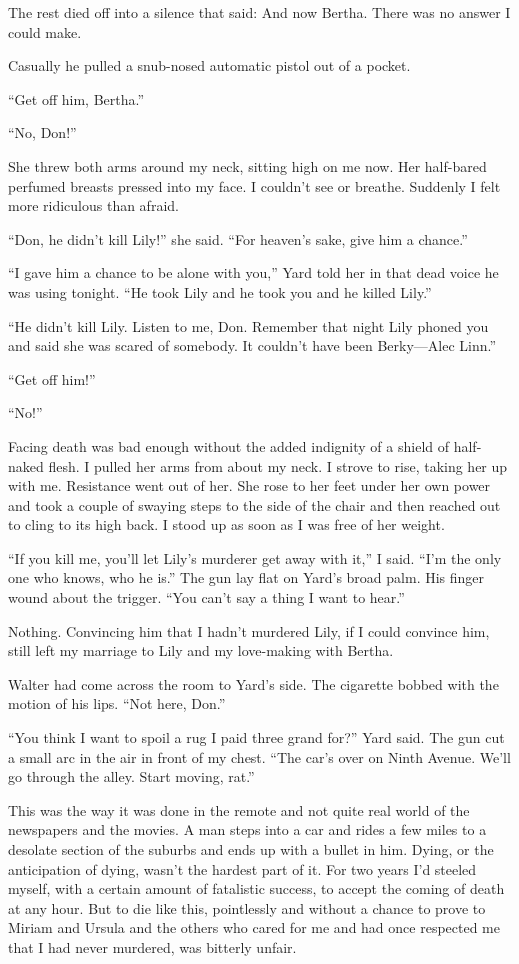 \documentclass{novel}
\begin{document}
The rest died off into a silence that said: And now Bertha. There was no answer I could make.

Casually he pulled a snub-nosed automatic pistol out of a pocket.

“Get off him, Bertha.”

“No, Don!”

She threw both arms around my neck, sitting high on me now. Her half-bared perfumed breasts pressed into my face. I couldn’t see or breathe. Suddenly I felt more ridiculous than afraid.

“Don, he didn’t kill Lily!” she said. “For heaven’s sake, give him a chance.”

“I gave him a chance to be alone with you,” Yard told her in that dead voice he was using tonight. “He took Lily and he took you and he killed Lily.”

“He didn’t kill Lily. Listen to me, Don. Remember that night Lily phoned you and said she was scared of somebody. It couldn’t have been Berky—Alec Linn.”

“Get off him!”

“No!”

Facing death was bad enough without the added indignity of a shield of half-naked flesh. I pulled her arms from about my neck. I strove to rise, taking her up with me. Resistance went out of her. She rose to her feet under her own power and took a couple of swaying steps to the side of the chair and then reached out to cling to its high back. I stood up as soon as I was free of her weight.

“If you kill me, you’ll let Lily’s murderer get away with it,” I said. “I’m the only one who knows, who he is.” The gun lay flat on Yard’s broad palm. His finger wound about the trigger. “You can’t say a thing I want to hear.”

Nothing. Convincing him that I hadn’t murdered Lily, if I could convince him, still left my marriage to Lily and my love-making with Bertha.

\scenestars

Walter had come across the room to Yard’s side. The cigarette bobbed with the motion of his lips. “Not here, Don.”

“You think I want to spoil a rug I paid three grand for?” Yard said. The gun cut a small arc in the air in front of my chest. “The car’s over on Ninth Avenue. We’ll go through the alley. Start moving, rat.”

This was the way it was done in the remote and not quite real world of the newspapers and the movies. A man steps into a car and rides a few miles to a desolate section of the suburbs and ends up with a bullet in him. Dying, or the anticipation of dying, wasn’t the hardest part of it. For two years I’d steeled myself, with a certain amount of fatalistic success, to accept the coming of death at any hour. But to die like this, pointlessly and without a chance to prove to Miriam and Ursula and the others who cared for me and had once respected me that I had never murdered, was bitterly unfair.
\end{document}
